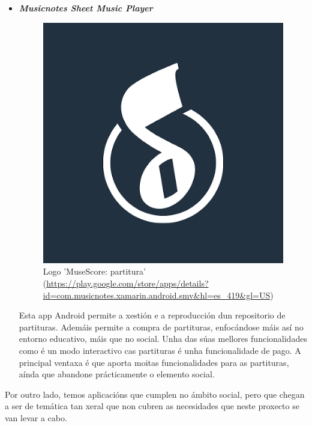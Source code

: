 \begin{itemize}
	\item \textbf{\textit{Musicnotes Sheet Music Player}}
	
	\begin{figure}[h!]
		\centering
		\includegraphics[scale=0.3]{06_imagenes/intro/music-notes.png}
		\caption{Logo 'MuseScore: partitura' (\url{https://play.google.com/store/apps/details?id=com.musicnotes.xamarin.android.smv&hl=es_419&gl=US})}
	\end{figure}
	
	Esta app Android permite a xestión e a reproducción dun repositorio de partituras. Ademáis permite a compra de partituras, enfocándose máis así no entorno educativo, máis que no social. Unha das súas mellores funcionalidades como é un modo interactivo cas partituras é unha funcionalidade de pago. A principal ventaxa é que aporta moitas funcionalidades para as partituras, aínda que abandone prácticamente o elemento social.
	
\end{itemize}

Por outro lado, temos aplicacións que cumplen no ámbito social, pero que chegan a ser de temática tan xeral que non cubren as necesidades que neste proxecto se van levar a cabo.

